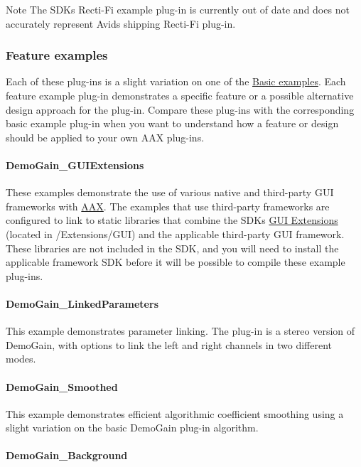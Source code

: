 \begin{DoxyNote}{Note}
The S\+D\+K\textquotesingle{}s Recti-\/\+Fi example plug-\/in is currently out of date and does not accurately represent Avid\textquotesingle{}s shipping Recti-\/\+Fi plug-\/in.
\end{DoxyNote}
\hypertarget{a00376_feature_examples}{}\subsubsection{Feature examples}\label{a00376_feature_examples}
Each of these plug-\/ins is a slight variation on one of the \hyperlink{a00376_basic_examples}{Basic examples}. Each feature example plug-\/in demonstrates a specific feature or a possible alternative design approach for the plug-\/in. Compare these plug-\/ins with the corresponding basic example plug-\/in when you want to understand how a feature or design should be applied to your own A\+A\+X plug-\/ins.\hypertarget{a00376_DemoGain_GUIExtensions}{}\paragraph{Demo\+Gain\+\_\+\+G\+U\+I\+Extensions}\label{a00376_DemoGain_GUIExtensions}
These examples demonstrate the use of various native and third-\/party G\+U\+I frameworks with \hyperlink{a00288}{A\+A\+X}. The examples that use third-\/party frameworks are configured to link to static libraries that combine the S\+D\+K\textquotesingle{}s \hyperlink{a00368}{G\+U\+I Extensions} (located in /\+Extensions/\+G\+U\+I) and the applicable third-\/party G\+U\+I framework. These libraries are not included in the S\+D\+K, and you will need to install the applicable framework S\+D\+K before it will be possible to compile these example plug-\/ins.\hypertarget{a00376_DemoGain_LinkedParameters}{}\paragraph{Demo\+Gain\+\_\+\+Linked\+Parameters}\label{a00376_DemoGain_LinkedParameters}
This example demonstrates parameter linking. The plug-\/in is a stereo version of Demo\+Gain, with options to link the left and right channels in two different modes.\hypertarget{a00376_DemoGain_Smoothed}{}\paragraph{Demo\+Gain\+\_\+\+Smoothed}\label{a00376_DemoGain_Smoothed}
This example demonstrates efficient algorithmic coefficient smoothing using a slight variation on the basic Demo\+Gain plug-\/in algorithm.\hypertarget{a00376_DemoGain_Background}{}\paragraph{Demo\+Gain\+\_\+\+Background}\label{a00376_DemoGain_Background}
